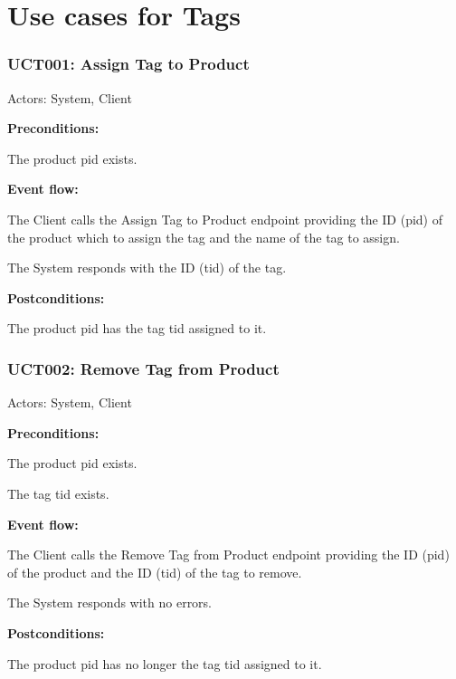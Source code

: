 \section{Use cases for Tags}

\begin{ucbox}{\subsubsection{UCT001: Assign Tag to Product}}
\label{UCT001}

Actors: System, Client

\textbf{Preconditions:}

\ucitem The product pid exists.

\textbf{Event flow:}

\ucitem The Client calls the Assign Tag to Product endpoint providing the ID (pid) of the product which to assign the tag and the name of the tag to assign.

\ucitem The System responds with the ID (tid) of the tag.

\textbf{Postconditions:}

\ucitem The product pid has the tag tid assigned to it.

\end{ucbox}

\begin{ucbox}{\subsubsection{UCT002: Remove Tag from Product}}
\label{UCT002}

Actors: System, Client

\textbf{Preconditions:}

\ucitem The product pid exists.

\ucitem The tag tid exists.

\textbf{Event flow:}

\ucitem The Client calls the Remove Tag from Product endpoint providing the ID (pid) of the product and the ID (tid) of the tag to remove.

\ucitem The System responds with no errors.

\textbf{Postconditions:}

\ucitem The product pid has no longer the tag tid assigned to it.

\end{ucbox}

